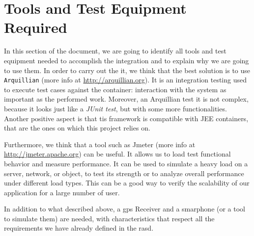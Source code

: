 \section{Tools and Test Equipment Required} \label{sec:tter}

In this section of the document, we are going to identify all tools and test equipment needed to accomplish the integration and to explain why we are going to use them.
In order to carry out the \acl{it}, we think that the best solution is to use \texttt{Arquillian} (more info at \url{http://arquillian.org}). It is an integration testing used to execute test cases against the container: interaction with the system as important as the performed work. Moreover, an Arquillian test it is not complex, because it looks just like a \textit{JUnit test}, but with some more functionalities. Another positive aspect is that tis framework is compatible with JEE containers, that are the ones on which this project relies on.
\newline

Furthermore, we think that a tool such as Jmeter (more info at \url{http://jmeter.apache.org}) can be useful. It allows us to load test functional behavior and measure performance. It can be used to simulate a heavy load on a server, network, or object, to test its strength or to analyze overall performance under different load types. This can be a good way to verify the scalability of our application for a large number of user.
\newline

In addition to what described above, a \acs{gps} Receiver and a smarphone (or a tool to simulate them) are needed, with characteristics that respect all the requirements we have already defined in the \acs{rasd}.